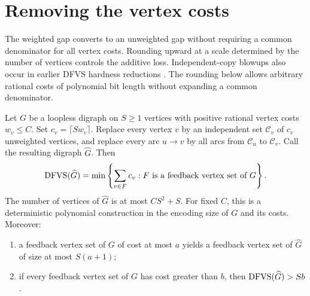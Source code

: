 \section{Removing the vertex costs}
\label{sec:unweighting}

The weighted gap converts to an unweighted gap without requiring a common
denominator for all vertex costs.  Rounding upward at a scale determined
by the number of vertices controls the additive loss. Independent-copy
blowups also occur in earlier DFVS hardness reductions
\cite[Section~2]{GuruswamiLee2016}. The rounding below allows arbitrary
rational costs of polynomial bit length without expanding a common
denominator.

\begin{lemma}
\label{lem:round-and-clone}
Let $G$ be a loopless digraph on $S\ge1$ vertices with positive rational
vertex costs $w_v\le C$.  Set $c_v=\lceil Sw_v\rceil$.  Replace every vertex
$v$ by an independent set $\mathcal C_v$ of $c_v$ unweighted vertices, and
replace every arc $u\to v$ by all arcs from $\mathcal C_u$ to
$\mathcal C_v$.  Call the resulting digraph $\widehat G$.  Then
\begin{equation}
  \operatorname{DFVS}(\widehat G)
  =\min\left\{\sum_{v\in F}c_v:
      F\text{ is a feedback vertex set of }G\right\}.
  \label{eq:clone-exact-optimum}
\end{equation}
The number of vertices of $\widehat G$ is at most $CS^2+S$.  For fixed
$C$, this is a deterministic polynomial construction in the encoding size
of $G$ and its costs.  Moreover:
\begin{enumerate}[label=(\roman*)]
  \item a feedback vertex set of $G$ of cost at most $a$ yields a feedback
  vertex set of $\widehat G$ of size at most $S(a+1)$;
  \item if every feedback vertex set of $G$ has cost greater than $b$,
  then $\operatorname{DFVS}(\widehat G)>Sb$.
\end{enumerate}
\end{lemma}

